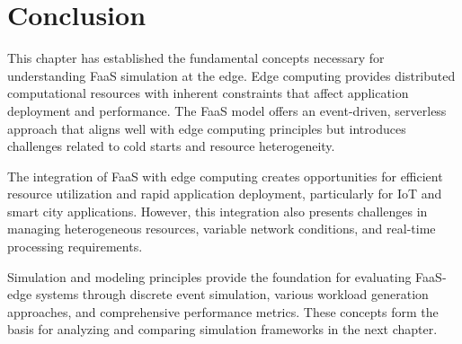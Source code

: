 \section{Conclusion}

This chapter has established the fundamental concepts necessary for understanding FaaS simulation at the edge. Edge computing provides distributed computational resources with inherent constraints that affect application deployment and performance. The FaaS model offers an event-driven, serverless approach that aligns well with edge computing principles but introduces challenges related to cold starts and resource heterogeneity.

The integration of FaaS with edge computing creates opportunities for efficient resource utilization and rapid application deployment, particularly for IoT and smart city applications. However, this integration also presents challenges in managing heterogeneous resources, variable network conditions, and real-time processing requirements.

Simulation and modeling principles provide the foundation for evaluating FaaS-edge systems through discrete event simulation, various workload generation approaches, and comprehensive performance metrics. These concepts form the basis for analyzing and comparing simulation frameworks in the next chapter.
